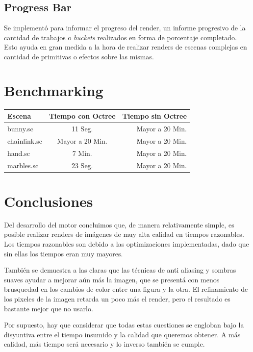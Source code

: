 \documentclass[a4paper,10pt]{article}
\begin{document}
\subsection{Progress Bar}

Se implement\'o para informar el progreso del render, un informe progresivo de
la cantidad de trabajos o \emph{buckets} realizados en forma de porcentaje
completado. Esto ayuda en gran medida a la hora de realizar renders de escenas
complejas en cantidad de primitivas o efectos sobre las mismas.

\section{Benchmarking}
\label{bench}

\begin{center}
\begin{tabular}{ | l | c | r | }
 \hline
   Escena & Tiempo con Octree & Tiempo sin Octree \\
 \hline
   bunny.sc & 11 Seg. & Mayor a 20 Min. \\
   chainlink.sc & Mayor a 20 Min. & Mayor a 20 Min. \\
   hand.sc & 7 Min. & Mayor a 20 Min. \\
   marbles.sc & 23 Seg. & Mayor a 20 Min. \\
 \hline  
 \end{tabular}

 
\end{center}


\section{Conclusiones}
\label{conc}

Del desarrollo del motor concluimos que, de manera relativamente simple, es
posible realizar renders de im\'agenes de muy alta calidad en tiempos
razonables.  Los tiempos razonables son debido a las optimizaciones
implementadas, dado que sin ellas los tiempos eran muy mayores.

Tambi\'en se demuestra a las claras que las t\'ecnicas de anti aliasing y
sombras suaves ayudar a mejorar a\'un m\'as la imagen, que se present\'a con
menos brusquedad en los cambios de color entre una figura y la otra.  El
refinamiento de los pixeles de la imagen retarda un poco m\'as el render, pero
el resultado es bastante mejor que no usarlo.

Por supuesto, hay que considerar que todas estas cuestiones se engloban bajo la
disyuntiva entre el tiempo insumido y la calidad que queremos obtener.  A m\'as
calidad, m\'as tiempo ser\'a necesario y lo inverso tambi\'en se cumple.
\end{document}
